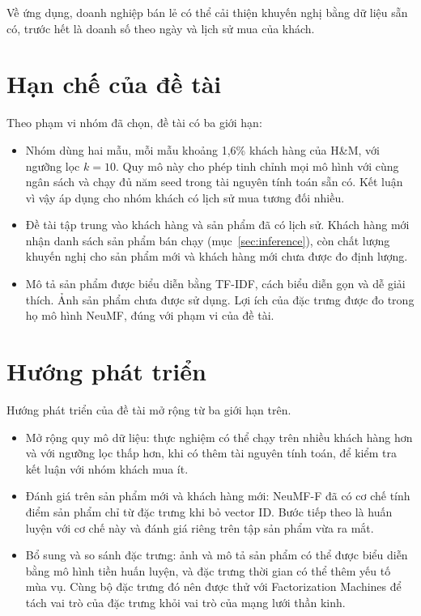 Về ứng dụng, doanh nghiệp bán lẻ có thể cải thiện khuyến nghị bằng dữ liệu sẵn có, trước hết là doanh số theo ngày và lịch sử mua của khách.

\section{Hạn chế của đề tài}
\label{sec:hanche}

Theo phạm vi nhóm đã chọn, đề tài có ba giới hạn:
\begin{itemize}
    \item Nhóm dùng hai mẫu, mỗi mẫu khoảng 1,6\% khách hàng của H\&M, với ngưỡng lọc $k = 10$. Quy mô này cho phép tinh chỉnh mọi mô hình với cùng ngân sách và chạy đủ năm seed trong tài nguyên tính toán sẵn có. Kết luận vì vậy áp dụng cho nhóm khách có lịch sử mua tương đối nhiều.
    \item Đề tài tập trung vào khách hàng và sản phẩm đã có lịch sử. Khách hàng mới nhận danh sách sản phẩm bán chạy (mục~\ref{sec:inference}), còn chất lượng khuyến nghị cho sản phẩm mới và khách hàng mới chưa được đo định lượng.
    \item Mô tả sản phẩm được biểu diễn bằng TF-IDF, cách biểu diễn gọn và dễ giải thích. Ảnh sản phẩm chưa được sử dụng. Lợi ích của đặc trưng được đo trong họ mô hình NeuMF, đúng với phạm vi của đề tài.
\end{itemize}

\section{Hướng phát triển}
\label{sec:huongphattrien}

Hướng phát triển của đề tài mở rộng từ ba giới hạn trên.
\begin{itemize}
    \item Mở rộng quy mô dữ liệu: thực nghiệm có thể chạy trên nhiều khách hàng hơn và với ngưỡng lọc thấp hơn, khi có thêm tài nguyên tính toán, để kiểm tra kết luận với nhóm khách mua ít.
    \item Đánh giá trên sản phẩm mới và khách hàng mới: NeuMF-F đã có cơ chế tính điểm sản phẩm chỉ từ đặc trưng khi bỏ vector ID. Bước tiếp theo là huấn luyện với cơ chế này và đánh giá riêng trên tập sản phẩm vừa ra mắt.
    \item Bổ sung và so sánh đặc trưng: ảnh và mô tả sản phẩm có thể được biểu diễn bằng mô hình tiền huấn luyện, và đặc trưng thời gian có thể thêm yếu tố mùa vụ. Cùng bộ đặc trưng đó nên được thử với Factorization Machines để tách vai trò của đặc trưng khỏi vai trò của mạng lưới thần kinh.
\end{itemize}
